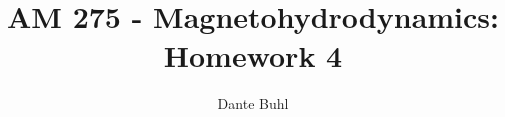 \documentclass{article}
\begin{document}
\title{AM 275 - Magnetohydrodynamics: Homework 4}
\author{Dante Buhl}


\newcommand{\wrms}{w_{\text{rms}}}
\newcommand{\bs}[1]{\boldsymbol{#1}}
\newcommand{\tb}[1]{\textbf{#1}}
\newcommand{\bmp}[1]{\begin{minipage}{#1\textwidth}}
\newcommand{\emp}{\end{minipage}}
\newcommand{\R}{\mathbb{R}}
\newcommand{\C}{\mathbb{C}}
\newcommand{\N}{\mathcal{N}}
\newcommand{\m}{\bs{\mu}_*}
\newcommand{\s}{\bs{\Sigma}_*}
\newcommand{\dt}{\Delta t}
\newcommand{\dx}{\Delta x}
\newcommand{\tr}[1]{\text{Tr}(#1)}
\newcommand{\Tr}[1]{\text{Tr}(#1)}
\newcommand{\Div}{\nabla \cdot}
\renewcommand{\div}{\nabla \cdot}
\newcommand{\Curl}{\nabla \times}
\newcommand{\Grad}{\nabla}
\newcommand{\grad}{\nabla}
\newcommand{\grads}{\nabla_s}
\newcommand{\gradf}{\nabla_f}
\newcommand{\xs}{x_s}
\newcommand{\x}{\bs{x}}
\newcommand{\xf}{x_f}
\newcommand{\ts}{t_s}
\newcommand{\tf}{t_f}
\newcommand{\pt}{\partial t}
\newcommand{\pz}{\partial z}
\newcommand{\uvec}{\bs{u}}
\newcommand{\bvec}{\bs{B}}
\newcommand{\nvec}{\hat{\bs{n}}}
\newcommand{\tu}{\tilde{\uvec}}
\newcommand{\B}{\bs{B}}
\newcommand{\A}{\bs{A}}
\newcommand{\jvec}{\bs{j}}
\newcommand{\F}{\bs{F}}
\newcommand{\T}{\tilde{T}}
\newcommand{\ez}{\bs{e}_z}
\newcommand{\ex}{\bs{e}_x}
\newcommand{\ey}{\bs{e}_y}
\newcommand{\eo}{\bs{e}_{\bs{\Omega}}}
\newcommand{\ppt}[1]{\frac{\partial #1}{\partial t}}
\newcommand{\pp}[2]{\frac{\partial #1}{\partial #2}}
\newcommand{\pptwo}[2]{\frac{\partial^2 #1}{\partial #2^2}}
\newcommand{\ddtwo}[2]{\frac{d^2 #1}{d #2^2}}
\newcommand{\DDt}[1]{\frac{D #1}{D t}}
\newcommand{\ppts}[1]{\frac{\partial #1}{\partial t_s}}
\newcommand{\pptf}[1]{\frac{\partial #1}{\partial t_f}}
\newcommand{\ppz}[1]{\frac{\partial #1}{\partial z}}
\newcommand{\ddz}[1]{\frac{d #1}{d z}}
\newcommand{\ppzetas}[1]{\frac{\partial^2 #1}{\partial \zeta^2}}
\newcommand{\ppzs}[1]{\frac{\partial #1}{\partial z_s}}
\newcommand{\ppzf}[1]{\frac{\partial #1}{\partial z_f}}
\newcommand{\ppx}[1]{\frac{\partial #1}{\partial x}}
\newcommand{\ddx}[1]{\frac{d #1}{d x}}
\newcommand{\ppxi}[1]{\frac{\partial #1}{\partial x_i}}
\newcommand{\ppxj}[1]{\frac{\partial #1}{\partial x_j}}
\newcommand{\ppy}[1]{\frac{\partial #1}{\partial y}}
\newcommand{\ppzeta}[1]{\frac{\partial #1}{\partial \zeta}}
\renewcommand{\k}{\bs{k}}
\newcommand{\real}[1]{\text{Re}\left[#1\right]}


\maketitle 
\setlength{\parindent}{0pt}
\end{document}
